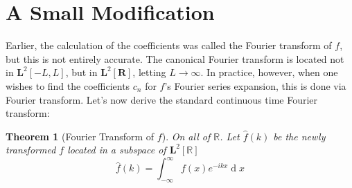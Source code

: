 \documentclass[12pt,a4paper]{report}
\DeclareMathOperator{\deriv}{d}
\theoremstyle{thms}
\newtheorem{theorem}{Theorem}[section]
\theoremstyle{defns}
\begin{document}
\section{A Small Modification}
Earlier, the calculation of the coefficients was called the Fourier transform of $f$, but this is not entirely accurate. The canonical Fourier transform is located not in $\mathbf{L}^2[-L, L]$, but in $\mathbf{L}^2[\mathbf{R}]$, letting $L \to \infty$. In practice, however, when one wishes to find the coefficients $c_n$ for $f$'s Fourier series expansion, this is done via Fourier transform. Let's now derive the standard continuous time Fourier transform:

\begin{theorem}[Fourier Transform of $f$]
    On all of $\mathbb{R}$.
    Let $\hat{f}(k)$ be the newly transformed $f$ located in a subspace of $\mathbf{L}^2[\mathbb{R}]$
    \begin{equation}
        \hat{f}(k) = \int_{-\infty}^{\infty} f(x)e^{-ikx}\deriv{x}
    \end{equation}
\end{theorem}
\end{document}

